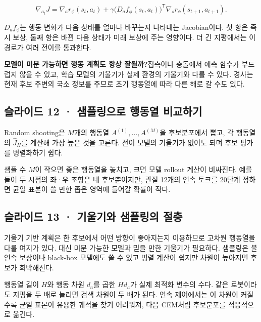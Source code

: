 \documentclass[11pt,a4paper]{article}
\begin{document}
\[
\nabla_{a_t}J=
\nabla_a r_\phi(s_t,a_t)
+\gamma\bigl(D_a f_\phi(s_t,a_t)\bigr)^{\mathsf T}
\nabla_s r_\phi(s_{t+1},a_{t+1}).
\]

$D_a f_\phi$는 행동 변화가 다음 상태를 얼마나 바꾸는지 나타내는 Jacobian이다. 첫 항은 즉시 보상, 둘째 항은 바뀐 다음 상태가 미래 보상에 주는 영향이다. 더 긴 지평에서는 이 경로가 여러 전이를 통과한다.\par

\par\medskip\noindent\textbf{모델이 미분 가능하면 행동 계획도 항상 잘될까?}\quad 접촉이나 충돌에서 예측 함수가 부드럽지 않을 수 있고, 학습 모델의 기울기가 실제 환경의 기울기와 다를 수 있다. 경사는 현재 후보 주변의 국소 정보를 주므로 초기 행동열에 따라 다른 해로 갈 수도 있다.\par

\subsection{슬라이드 12 · 샘플링으로 행동열 비교하기}

Random shooting은 $M$개의 행동열 $A^{(1)},\ldots,A^{(M)}$을 후보분포에서 뽑고, 각 행동열의 $\widehat J_H$를 계산해 가장 높은 것을 고른다. 전이 모델의 기울기가 없어도 되며 후보 평가를 병렬화하기 쉽다.\par

샘플 수 $M$이 작으면 좋은 행동열을 놓치고, 크면 모델 rollout 계산이 비싸진다. 예를 들어 두 시점의 좌·우 조향은 네 후보뿐이지만, 관절 12개의 연속 토크를 20단계 정하면 균일 표본이 쓸 만한 좁은 영역에 들어갈 확률이 작다.\par

\subsection{슬라이드 13 · 기울기와 샘플링의 절충}

기울기 기반 계획은 한 후보에서 어떤 방향이 좋아지는지 이용하므로 고차원 행동열을 다룰 여지가 있다. 대신 미분 가능한 모델과 믿을 만한 기울기가 필요하다. 샘플링은 불연속 보상이나 black-box 모델에도 쓸 수 있고 병렬 계산이 쉽지만 차원이 높아지면 후보가 희박해진다.\par

행동열 길이 $H$와 행동 차원 $d_a$를 곱한 $Hd_a$가 실제 최적화 변수의 수다. 같은 로봇이라도 지평을 두 배로 늘리면 검색 차원이 두 배가 된다. 연속 제어에서는 이 차원이 커질수록 균일 표본이 유용한 궤적을 찾기 어려워져, 다음 CEM처럼 후보분포를 적응적으로 옮긴다.\par
\end{document}
